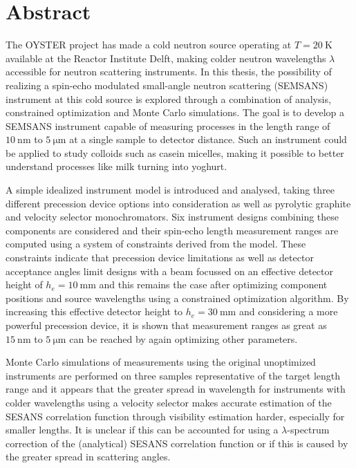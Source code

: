 \chapter*{Abstract}

The OYSTER project has made a cold neutron source operating at $T = \SI{20}{\kelvin}$ available at the Reactor Institute Delft, making colder neutron wavelengths $\lambda$ accessible for neutron scattering instruments. In this thesis, the possibility of realizing a spin-echo modulated small-angle neutron scattering (SEMSANS) instrument at this cold source is explored through a combination of analysis, constrained optimization and Monte Carlo simulations. The goal is to develop a SEMSANS instrument capable of measuring processes in the length range of $\SI{10}{\nano\meter}$ to $\SI{5}{\micro\meter}$ at a single sample to detector distance. Such an instrument could be applied to study colloids such as casein micelles, making it possible to better understand processes like milk turning into yoghurt. 

A simple idealized instrument model is introduced and analysed, taking three different precession device options into consideration as well as pyrolytic graphite and velocity selector monochromators. Six instrument designs combining these components are considered and their spin-echo length measurement ranges are computed using a system of constraints derived from the model. These constraints indicate that precession device limitations as well as detector acceptance angles limit designs with a beam focussed on an effective detector height of $h_e = \SI{10}{\milli\meter}$ and this remains the case after optimizing component positions and source wavelengths using a constrained optimization algorithm. By increasing this effective detector height to $h_e = \SI{30}{\milli\meter}$ and considering a more powerful precession device, it is shown that measurement ranges as great as $\SI{15}{\nano\meter}$ to $\SI{5}{\micro\meter}$ can be reached by again optimizing other parameters.

Monte Carlo simulations of measurements using the original unoptimized instruments are performed on three samples representative of the target length range and it appears that the greater spread in wavelength for instruments with colder wavelengths using a velocity selector makes accurate estimation of the SESANS correlation function through visibility estimation harder, especially for smaller lengths. It is unclear if this can be accounted for using a $\lambda$-spectrum correction of the (analytical) SESANS correlation function or if this is caused by the greater spread in scattering angles.


